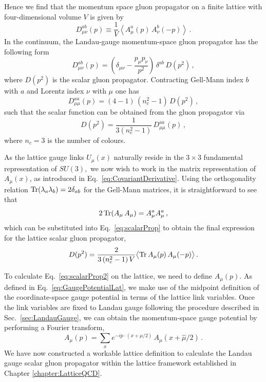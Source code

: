 Hence we find that the momentum space gluon propagator on a finite lattice with four-dimensional volume $V$ is given by
%
\begin{equation}
D_{\mu\nu}^{ab}(p) \equiv \frac{1}{V}\left \langle A^a_\mu (p)\,A^b_\nu(-p)\right\rangle \, . \label{eq:gluonProp}
\end{equation}
%
In the continuum, the Landau-gauge momentum-space gluon propagator has the following form~\cite{Leinweber:1998im,Bonnet:2001uh}
%
\begin{equation}
D^{ab}_{\mu\nu}(p) = \left ( \delta_{\mu\nu} - \frac{p_\mu p_\nu}{p^2} \right )\,\delta^{ab}\,D(p^2) \, ,
\end{equation}
%
where $D(p^2)$ is the scalar gluon propagator.  Contracting Gell-Mann index $b$ with $a$ and
Lorentz index $\nu$ with $\mu$ one has
%
\begin{equation}
D^{aa}_{\mu\mu}(p) = (4-1)\,(n_c^2-1)\,D(p^2) \, ,
\end{equation}
%
such that the scalar function can be obtained from the gluon propagator via
%
\begin{equation}
D(p^2) = \frac{1}{3(n_c^2-1)}\,D^{aa}_{\mu\mu}(p) \, ,
\label{eq:scalarProp}
\end{equation}
%
where $n_c = 3$ is the number of colours.

As the lattice gauge links $U_\mu(x)$ naturally reside in the $3\times 3$ fundamental representation of $SU(3),$ we now wish to work in the matrix representation of $A_\mu(x)$, as introduced in Eq.~\eqref{eq:CovariantDerivative}. Using the orthogonality relation $\operatorname{Tr}(\lambda_a\lambda_b) = 2\delta_{ab}$ for the Gell-Mann matrices, it is straightforward to see that
%
\begin{equation}
2\operatorname{Tr}(A_\mu\,A_\mu) = A^a_\mu A^a_\mu\, ,
\end{equation}
%
which can be substituted into Eq.~\eqref{eq:scalarProp} to obtain the final expression for the lattice scalar gluon propagator,
%
\begin{equation}
D(p^2) = \frac{2}{3\,(n_c^2-1)\,V}\big\langle {\rm Tr}\, A_\mu(p)\,A_\mu(-p) \big\rangle \,. \label{eq:scalarProp2}
\end{equation}

To calculate Eq.~\eqref{eq:scalarProp2} on the lattice, we need to define $A_\mu(p)$. As defined in Eq.~\eqref{eq:GaugePotentialLat}, we make use of the midpoint definition of the coordinate-space gauge potential in terms of the lattice link variables. Once the link variables are fixed to Landau gauge following the procedure described in Sec.~\ref{sec:LandauGauge}, we can obtain the momentum-space gauge potential by performing a Fourier transform,
%
\begin{equation}
A_\mu(p) = \sum_x e^{-ip\cdot(x+\hat{\mu}/2)}\, A_\mu(x+\hat{\mu}/2)\, .
\end{equation}
%
We have now constructed a workable lattice definition to calculate the Landau gauge scalar gluon propagator within the lattice framework established in Chapter \ref{chapter:LatticeQCD}.

